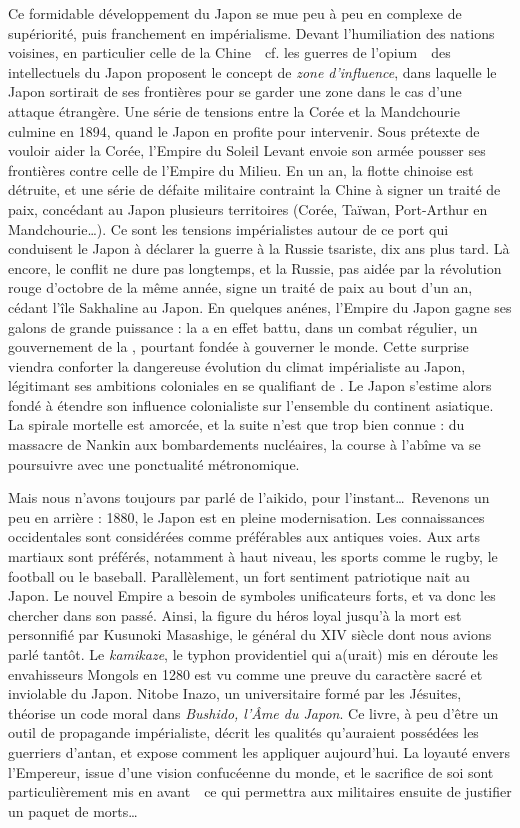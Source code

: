 Ce formidable développement du Japon se mue peu à peu en complexe de
supériorité, puis franchement en impérialisme. Devant l'humiliation des nations
voisines, en particulier celle de la Chine~\incise~cf. les guerres de
l'opium~\incise~des intellectuels du Japon proposent le concept de \emph{zone
d'influence}, dans laquelle le Japon sortirait de ses frontières pour se garder
une zone  dans le cas d'une attaque étrangère. Une série de
tensions entre la Corée et la Mandchourie culmine en 1894, quand le Japon en
profite pour intervenir. Sous prétexte de vouloir aider la Corée, l'Empire du
Soleil Levant envoie son armée pousser ses frontières contre celle de l'Empire
du Milieu. En un an, la flotte chinoise est détruite, et une série de défaite
militaire contraint la Chine à signer un traité de paix, concédant au Japon
plusieurs territoires (Corée, Taïwan, Port-Arthur en Mandchourie\dots). Ce sont
les tensions impérialistes autour de ce port qui conduisent le Japon à déclarer
la guerre à la Russie tsariste, dix ans plus tard. Là encore, le conflit ne
dure pas longtemps, et la Russie, pas aidée par la révolution rouge d'octobre
de la même année, signe un traité de paix au bout d'un an, cédant l'île
Sakhaline au Japon. En quelques anénes, l'Empire du Japon gagne ses galons de
grande puissance : la  a en effet battu, dans un combat
régulier, un gouvernement de la , pourtant fondée à
gouverner le monde. Cette surprise viendra conforter la dangereuse évolution du
climat impérialiste au Japon, légitimant ses ambitions coloniales en se
qualifiant de . Le Japon s'estime alors fondé à étendre
son influence colonialiste sur l'ensemble du continent asiatique. La spirale
mortelle est amorcée, et la suite n'est que trop bien connue : du massacre de
Nankin aux bombardements nucléaires, la course à l'abîme va se poursuivre avec
une ponctualité métronomique.

Mais nous n'avons toujours par parlé de l'aikido, pour l'instant\dots\
Revenons un peu en arrière : 1880, le Japon est en pleine modernisation. Les
connaissances occidentales sont considérées comme préférables aux antiques
voies. Aux arts martiaux sont préférés, notamment à haut niveau, les sports
\guil{civilisés} comme le rugby, le football ou le baseball. Parallèlement, un
fort sentiment patriotique nait au Japon. Le nouvel Empire a besoin de
symboles unificateurs forts, et va donc les chercher dans son passé. Ainsi, la
figure du héros loyal jusqu'à la mort est personnifié par Kusunoki Masashige,
le général du XIV\up{e} siècle dont nous avions parlé tantôt. Le
\emph{kamikaze}, le typhon providentiel qui a(urait) mis en déroute les
envahisseurs Mongols en 1280 est vu comme une preuve du caractère sacré et
inviolable du Japon. Nitobe Inazo, un universitaire formé par les Jésuites,
théorise un code moral dans \emph{Bushido, l'Âme du Japon}. Ce livre, à peu
d'être un outil de propagande impérialiste, décrit les qualités qu'auraient
possédées les guerriers d'antan, et expose comment les appliquer aujourd'hui.
La loyauté envers l'Empereur, issue d'une vision confucéenne du monde, et le
sacrifice de soi sont particulièrement mis en avant~\incise~ce qui permettra
aux militaires ensuite de justifier un paquet de morts\dots

